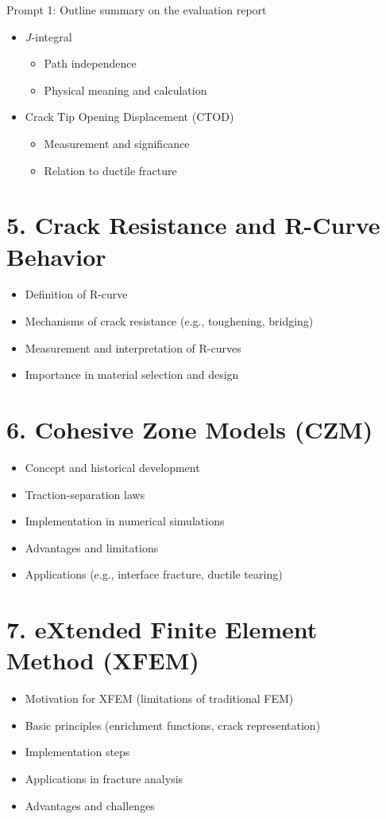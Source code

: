 \documentclass[12pt]{article}
\begin{document}
\newpage
\begin{summarybox}{Prompt 1: Outline summary on the evaluation report}

\begin{itemize}
    \item $J$-integral
    \begin{itemize}
        \item Path independence
        \item Physical meaning and calculation
    \end{itemize}
    \item Crack Tip Opening Displacement (CTOD)
    \begin{itemize}
        \item Measurement and significance
        \item Relation to ductile fracture
    \end{itemize}
\end{itemize}
\section*{5. Crack Resistance and R-Curve Behavior }
\begin{itemize}
    \item Definition of R-curve
    \item Mechanisms of crack resistance (e.g., toughening, bridging)
    \item Measurement and interpretation of R-curves
    \item Importance in material selection and design
\end{itemize}
\section*{6. Cohesive Zone Models (CZM) }
\begin{itemize}
    \item Concept and historical development
    \item Traction-separation laws
    \item Implementation in numerical simulations
    \item Advantages and limitations
    \item Applications (e.g., interface fracture, ductile tearing)
\end{itemize}
\section*{7. eXtended Finite Element Method (XFEM) }
\begin{itemize}
    \item Motivation for XFEM (limitations of traditional FEM)
    \item Basic principles (enrichment functions, crack representation)
    \item Implementation steps
    \item Applications in fracture analysis
    \item Advantages and challenges
\end{itemize}
\end{summarybox}
\end{document}
